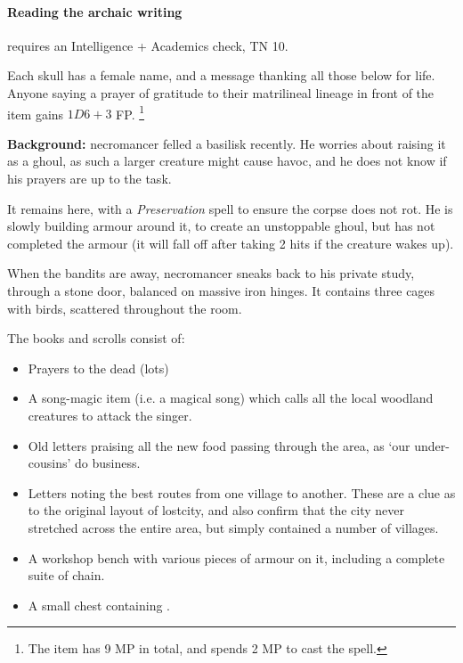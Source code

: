 \begin{multicols}{2}
\paragraph{Reading the archaic writing}
requires an Intelligence + Academics check, TN 10.

Each skull has a female name, and a message thanking all those below for life.
Anyone saying a prayer of gratitude to their matrilineal lineage in front of the item gains $1D6+3$ FP.%
\footnote{The item has 9 MP in total, and spends 2 MP to cast the spell.}


\textbf{Background:}
\Gls{necromancer} felled a basilisk recently.
He worries about raising it as a ghoul, as such a larger creature might cause havoc, and he does not know if his prayers are up to the task.

It remains here, with a \textit{Preservation} spell to ensure the corpse does not rot.
He is slowly building armour around it, to create an unstoppable ghoul, but has not completed the armour (it will fall off after taking 2 hits if the creature wakes up).


When the bandits are away, \gls{necromancer} sneaks back to his private study, through a stone door, balanced on massive iron hinges.
It contains three cages with birds, scattered throughout the room.

The books and scrolls consist of:

\begin{itemize}

  \item
  Prayers to the dead (lots)
  \item
  A song-magic item (i.e. a magical song) which calls all the local woodland creatures to attack the singer.%
  \iftoggle{aif}{\footnote{See \autopageref{medalofheroism}.}}{}
  \item
  Old letters praising all the new food passing through the area, as `our under-cousins' do business.
  \item
  Letters noting the best routes from one village to another.
  These are a clue as to the original layout of \gls{lostcity}, and also confirm that the city never stretched across the entire area, but simply contained a number of villages.
  \item
  A workshop bench with various pieces of armour on it, including a complete suite of chain.
  \item
  A small chest containing \lootMedium.


\end{itemize}
\end{multicols}
